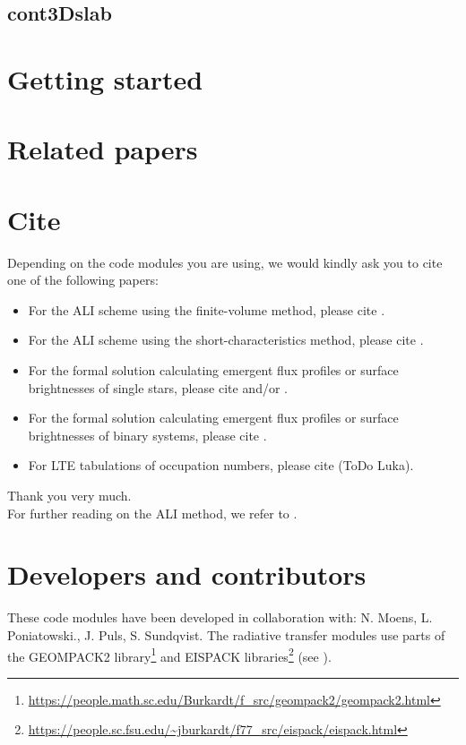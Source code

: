 \documentclass[10pt,a4paper]{article}
\begin{document}
%
\subsection{cont3Dslab}
\label{subsec:cont3d}
%


\section{Getting started}
\section{Related papers}


\section{Cite}
Depending on the code modules you are using, we would kindly ask you to cite one of the following papers:
\begin{itemize}
\item For the ALI scheme using the finite-volume method, please cite \cite{Hennicker2018}.
\item For the ALI scheme using the short-characteristics method, please cite \cite{Hennicker2020}.
\item For the formal solution calculating emergent flux profiles or surface brightnesses of single stars, please cite \cite{Hennicker2018} and/or \cite{Hennicker2021}.
\item For the formal solution calculating emergent flux profiles or surface brightnesses of binary systems, please cite \cite{Hennicker2021}.
\item For LTE tabulations of occupation numbers, please cite \cite{Poniatowski2021} (ToDo Luka).
\end{itemize}
Thank you very much. \\
For further reading on the ALI method, we refer to \cite{Hennicker2020b}.


\section{Developers and contributors}
These code modules have been developed in collaboration with: N. Moens, L. Poniatowski., J. Puls, S. Sundqvist.
The radiative transfer modules use parts of the GEOMPACK2 library\footnote{\url{https://people.math.sc.edu/Burkardt/f_src/geompack2/geompack2.html}} and
EISPACK libraries\footnote{\url{https://people.sc.fsu.edu/~jburkardt/f77_src/eispack/eispack.html}} (see \cite{Joe1991}).
\end{document}
